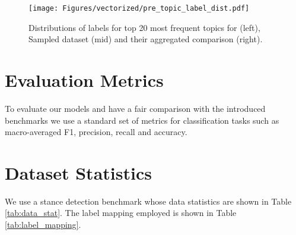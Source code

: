 \documentclass[11pt]{article}
\begin{document}
\begin{figure*}
\centering
\texttt{[image: Figures/vectorized/pre\_topic\_label\_dist.pdf]}
\caption{Distributions of labels for top 20 most frequent topics for  (left), Sampled dataset  (mid) and their aggregated comparison (right).
}
\label{fig:per_topic_big}
\end{figure*}


\section{Evaluation Metrics}

To evaluate our models and have a fair comparison with the introduced benchmarks we use a standard set of metrics for classification tasks such as macro-averaged F1, precision, recall and accuracy.



\section{Dataset Statistics}
\label{Appendix:data}
We use a stance detection benchmark \citep{hardalov2021cross} whose data statistics are shown in Table \ref{tab:data_stat}. The label mapping employed is shown in Table \ref{tab:label_mapping}.
\end{document}
